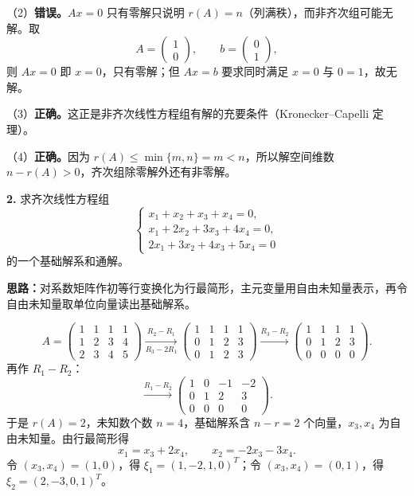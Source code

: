 （2）\textbf{错误。}$Ax=0$ 只有零解只说明 $r(A)=n$（列满秩），而非齐次组可能无解。取
\[
A=\begin{pmatrix}1\\0\end{pmatrix},\qquad b=\begin{pmatrix}0\\1\end{pmatrix},
\]
则 $Ax=0$ 即 $x=0$，只有零解；但 $Ax=b$ 要求同时满足 $x=0$ 与 $0=1$，故无解。

（3）\textbf{正确。}这正是非齐次线性方程组有解的充要条件（Kronecker--Capelli 定理）。

（4）\textbf{正确。}因为 $r(A)\le\min\{m,n\}=m<n$，所以解空间维数 $n-r(A)>0$，齐次组除零解外还有非零解。

\else \answerarea[8] \fi%

\textbf{2.} 求齐次线性方程组
\[
\begin{cases}
x_1+x_2+x_3+x_4=0,\\
x_1+2x_2+3x_3+4x_4=0,\\
2x_1+3x_2+4x_3+5x_4=0
\end{cases}
\]
的一个基础解系和通解。

\ifshowsolutions%

\textbf{思路：}对系数矩阵作初等行变换化为行最简形，主元变量用自由未知量表示，再令自由未知量取单位向量读出基础解系。

\[
A=\begin{pmatrix}
1&1&1&1\\
1&2&3&4\\
2&3&4&5
\end{pmatrix}
\xrightarrow[R_3-2R_1]{R_2-R_1}
\begin{pmatrix}
1&1&1&1\\
0&1&2&3\\
0&1&2&3
\end{pmatrix}
\xrightarrow{R_3-R_2}
\begin{pmatrix}
1&1&1&1\\
0&1&2&3\\
0&0&0&0
\end{pmatrix}.
\]
再作 $R_1-R_2$：
\[
\xrightarrow{R_1-R_2}
\begin{pmatrix}
1&0&-1&-2\\
0&1&2&3\\
0&0&0&0
\end{pmatrix}.
\]
于是 $r(A)=2$，未知数个数 $n=4$，基础解系含 $n-r=2$ 个向量，$x_3,x_4$ 为自由未知量。由行最简形得
\[
x_1=x_3+2x_4,\qquad x_2=-2x_3-3x_4.
\]
令 $(x_3,x_4)=(1,0)$，得 $\xi_1=(1,-2,1,0)^T$；令 $(x_3,x_4)=(0,1)$，得 $\xi_2=(2,-3,0,1)^T$。

